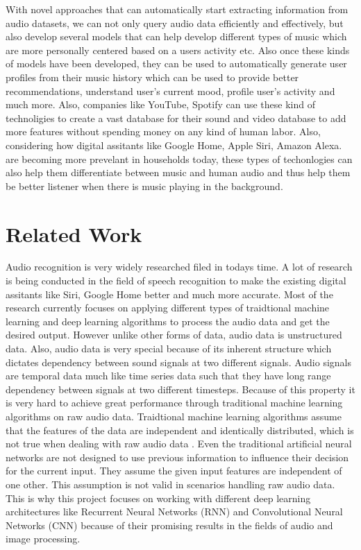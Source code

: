 \documentclass[letterpaper, 12 pt, conference]{ieeeconf}  %
\begin{document}
With novel approaches that can automatically start extracting information from audio datasets, we can not only query audio data efficiently and effectively, but also develop several models that can help develop different types of music which are more personally centered based on a users activity etc. Also once these kinds of models have been developed, they can be used to automatically generate user profiles from their music history which can be used to provide better recommendations, understand user's current mood, profile user's activity and much more. Also, companies like YouTube, Spotify can use these kind of technoligies to create a vast database for their sound and video database to add more features without spending money on any kind of human labor. Also, considering how digital assitants like Google Home, Apple Siri, Amazon Alexa. are becoming more prevelant in households today, these types of techonlogies can also help them differentiate between music and human audio and thus help them be better listener when there is music playing in the background.




\section{\textbf{Related Work}}
Audio recognition is very widely researched filed in todays time. A lot of research is being conducted in the field of speech recognition to make the existing digital assitants like Siri, Google Home better and much more accurate. Most of the research currently focuses on applying different types of traidtional machine learning and deep learning algorithms to process the audio data and get the desired output. However unlike other forms of data, audio data is unstructured data. Also, audio data is very special because of its inherent structure which dictates dependency between sound signals at two different signals. Audio signals are temporal data much like time series data such that they have long range dependency between signals at two different timesteps. Because of this property it is very hard to achieve great performance through traditional machine learning algorithms on raw audio data. Traidtional machine learning algorithms assume that the features of the data are independent and identically distributed, which is not true when dealing with raw audio data	. Even the traditional artificial neural networks are not designed to use previous information to influence their decision for the current input. They assume the given input features are independent of one other. This assumption is not valid in scenarios handling raw audio data. This is why this project focuses on working with different deep learning architectures like Recurrent Neural Networks (RNN) and Convolutional Neural Networks (CNN) because of their promising results in the fields of audio and image processing.
\end{document}
